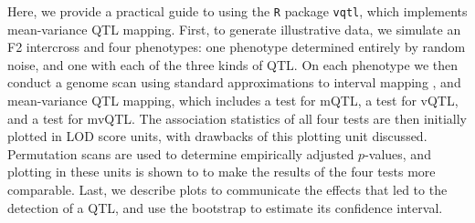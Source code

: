 \documentclass[9pt,twocolumn,twoside]{gsag3jnl}
\begin{document}
Here, we provide a practical guide to using the \texttt{R} package \texttt{vqtl}, which implements mean-variance QTL mapping.
First, to generate illustrative data, we simulate an F2 intercross and four phenotypes: one phenotype determined entirely by random noise, and one with each of the three kinds of QTL.
On each phenotype we then conduct a genome scan using standard approximations to interval mapping \citep{Lander1989a,Martinez1992}, and mean-variance QTL mapping, which includes a test for mQTL, a test for vQTL, and a test for mvQTL.
The association statistics of all four tests are then initially plotted in LOD score units, with drawbacks of this plotting unit discussed.
Permutation scans are used to determine empirically adjusted $p$-values, and plotting in these units is shown to to make the results of the four tests more comparable.
Last, we describe plots to communicate the effects that led to the detection of a QTL, and use the bootstrap to estimate its confidence interval.





\end{document}
